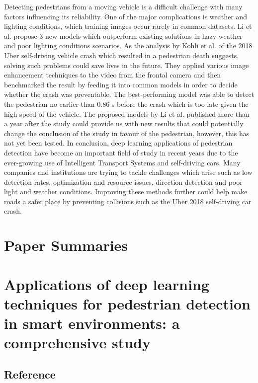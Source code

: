 \documentclass[11pt,a4paper]{article}
\begin{document}
\newline\newline
Detecting pedestrians from a moving vehicle is a difficult challenge with many factors influencing its reliability. One of the major complications is weather and lighting conditions, which training images occur rarely in common datasets. Li et al. \cite{li2019deep} propose 3 new models which outperform existing solutions in hazy weather and poor lighting conditions scenarios. As the analysis by Kohli et al. \cite{kohli2019enabling} of the 2018 Uber self-driving vehicle crash which resulted in a pedestrian death suggests, solving such problems could save lives in the future. They applied various image enhancement techniques to the video from the frontal camera and then benchmarked the result by feeding it into common models in order to decide whether the crash was preventable. The best-performing model was able to detect the pedestrian no earlier than 0.86 s before the crash which is too late given the high speed of the vehicle. The proposed models by Li et al. \cite{li2019deep} published more than a year after the study could provide us with new results that could potentially change the conclusion of the study in favour of the pedestrian, however, this has not yet been tested.
\newline\newline
In conclusion, deep learning applications of pedestrian detection have become an important field of study in recent years due to the ever-growing use of Intelligent Transport Systems and self-driving cars. Many companies and institutions are trying to tackle challenges which arise such as low detection rates, optimization and resource issues, direction detection and poor light and weather conditions. Improving these methods further could help make roads a safer place by preventing collisions such as the Uber 2018 self-driving car crash.

\newpage 
\section*{Paper Summaries}

\section*{Applications of deep learning techniques for pedestrian detection in smart environments: a comprehensive study}
\subsection*{Reference}
\end{document}

